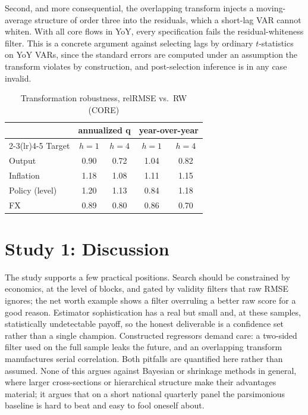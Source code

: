 \documentclass[conference]{IEEEtran}
\begin{document}
Second, and more consequential, the overlapping transform injects a moving-average structure of order three into the residuals, which a short-lag VAR cannot whiten. With all core flows in YoY, every specification fails the residual-whiteness filter. This is a concrete argument against selecting lags by ordinary $t$-statistics on YoY VARs, since the standard errors are computed under an assumption the transform violates by construction, and post-selection inference is in any case invalid.

\begin{table}[t]
\caption{Transformation robustness, relRMSE vs.\ RW (CORE)}
\label{tab:yoy}
\centering
\small
\begin{tabular}{@{}lcccc@{}}
\toprule
 & \multicolumn{2}{c}{annualized q} & \multicolumn{2}{c}{year-over-year} \\
\cmidrule(lr){2-3}\cmidrule(lr){4-5}
Target & $h{=}1$ & $h{=}4$ & $h{=}1$ & $h{=}4$ \\
\midrule
Output    & 0.90 & 0.72 & 1.04 & 0.82 \\
Inflation & 1.18 & 1.08 & 1.11 & 1.15 \\
Policy (level) & 1.20 & 1.13 & 0.84 & 1.18 \\
FX        & 0.89 & 0.80 & 0.86 & 0.70 \\
\bottomrule
\end{tabular}
\end{table}

\section{Study 1: Discussion}
The study supports a few practical positions. Search should be constrained by economics, at the level of blocks, and gated by validity filters that raw RMSE ignores; the net worth example shows a filter overruling a better raw score for a good reason. Estimator sophistication has a real but small and, at these samples, statistically undetectable payoff, so the honest deliverable is a confidence set rather than a single champion. Constructed regressors demand care: a two-sided filter used on the full sample leaks the future, and an overlapping transform manufactures serial correlation. Both pitfalls are quantified here rather than assumed. None of this argues against Bayesian or shrinkage methods in general, where larger cross-sections or hierarchical structure make their advantages material; it argues that on a short national quarterly panel the parsimonious baseline is hard to beat and easy to fool oneself about.
\end{document}
